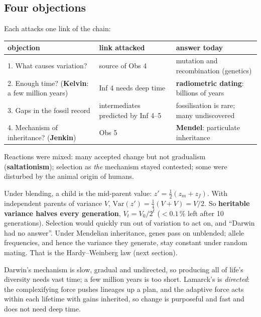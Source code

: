 \subsection{Four objections}
Each attacks one link of the chain:
\begin{center}\small
\begin{tabularx}{\textwidth}{XXX}
\toprule
objection & link attacked & answer today\\\midrule
1. What causes variation? & source of Obs 4 & mutation and recombination (genetics)\\
2. Enough time? (\textbf{Kelvin}: a few million years) & Inf 4 needs deep time & \textbf{radiometric dating}: billions of years\\
3. Gaps in the fossil record & intermediates predicted by Inf 4--5 & fossilisation is rare; many undiscovered\\
4. Mechanism of inheritance? (\textbf{Jenkin}) & Obs 5 & \textbf{Mendel}: particulate inheritance\\\bottomrule
\end{tabularx}
\end{center}
Reactions were mixed: many accepted change but not gradualism (\textbf{saltationism}); selection as \emph{the}
mechanism stayed contested; some were disturbed by the animal origin of humans.

\begin{chain}
Under blending, a child is the mid-parent value: $z'=\tfrac12(z_m+z_f)$. With independent parents of variance $V$,
$\mathrm{Var}(z')=\tfrac14(V+V)=V/2$. So \textbf{heritable variance halves every generation}, $V_t=V_0/2^t$
($<0.1\,\%$ left after 10 generations). Selection would quickly run out of variation to act on, and ``Darwin had no
answer''. Under Mendelian inheritance, genes pass on unblended; allele frequencies, and hence the variance they generate,
stay constant under random mating. That is the Hardy--Weinberg law (next section).
\end{chain}

\begin{worked}
Darwin's mechanism is slow, gradual and undirected, so producing all of life's diversity needs vast time; a few million
years is too short. Lamarck's is \emph{directed}: the complexifying force pushes lineages up a plan, and the adaptive force
acts within each lifetime with gains inherited, so change is purposeful and fast and does not need deep time.
\end{worked}

